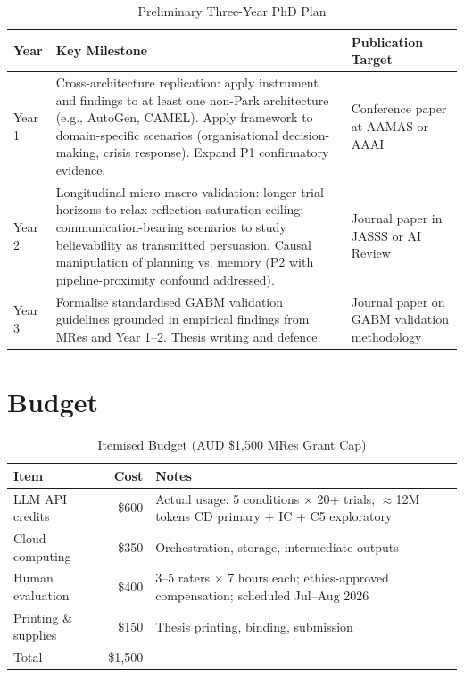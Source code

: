 \documentclass[11pt]{article}
\begin{document}
\begin{table}[h]
\centering
\caption{Preliminary Three-Year PhD Plan}
\label{tab:phd}
\begin{tabular}{p{}p{}p{}}
\toprule
Year & Key Milestone & Publication Target \\
\midrule
Year 1 & Cross-architecture replication: apply instrument and findings to at least one non-Park architecture (e.g., AutoGen, CAMEL). Apply framework to domain-specific scenarios (organisational decision-making, crisis response). Expand P1 confirmatory evidence. & Conference paper at AAMAS or AAAI \\
Year 2 & Longitudinal micro-macro validation: longer trial horizons to relax reflection-saturation ceiling; communication-bearing scenarios to study believability as transmitted persuasion. Causal manipulation of planning vs. memory (P2 with pipeline-proximity confound addressed). & Journal paper in JASSS or AI Review \\
Year 3 & Formalise standardised GABM validation guidelines grounded in empirical findings from MRes and Year 1--2. Thesis writing and defence. & Journal paper on GABM validation methodology \\
\bottomrule
\end{tabular}
\end{table}

\section{Budget}

\begin{table}[h]
\centering
\caption{Itemised Budget (AUD \$1,500 MRes Grant Cap)}
\label{tab:budget}
\begin{tabular}{p{}rp{}}
\toprule
Item & Cost & Notes \\
\midrule
LLM API credits & \$600 & Actual usage: 5 conditions $\times$ 20+ trials; $\approx$12M tokens CD primary + IC + C5 exploratory \\
Cloud computing & \$350 & Orchestration, storage, intermediate outputs \\
Human evaluation & \$400 & 3--5 raters $\times$ 7 hours each; ethics-approved compensation; scheduled Jul--Aug 2026 \\
Printing \& supplies & \$150 & Thesis printing, binding, submission \\
\midrule
Total & \$1,500 & \\
\bottomrule
\end{tabular}
\end{table}
\end{document}
